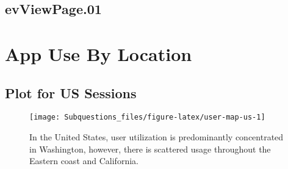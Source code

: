 \documentclass[
]{article}
\begin{document}
\hypertarget{evviewpage.01}{%
\subsection{evViewPage.01}\label{evviewpage.01}}

\hypertarget{app-use-by-location}{%
\section{App Use By Location}\label{app-use-by-location}}

\hypertarget{plot-for-us-sessions}{%
\subsection{Plot for US Sessions}\label{plot-for-us-sessions}}

\begin{figure}
\texttt{[image: Subquestions\_files/figure-latex/user-map-us-1]} \caption{In the United States, user utilization is predominantly concentrated in Washington, however, there is scattered usage throughout the Eastern coast and California.}\label{fig:user-map-us}
\end{figure}
\newpage
\newpage
\end{document}
